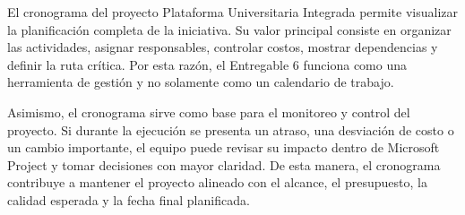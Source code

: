 \documentclass[11pt,spanish]{article}
\begin{document}
El cronograma del proyecto Plataforma Universitaria Integrada permite visualizar la planificación completa de la iniciativa. Su valor principal consiste en organizar las actividades, asignar responsables, controlar costos, mostrar dependencias y definir la ruta crítica. Por esta razón, el Entregable 6 funciona como una herramienta de gestión y no solamente como un calendario de trabajo.

Asimismo, el cronograma sirve como base para el monitoreo y control del proyecto. Si durante la ejecución se presenta un atraso, una desviación de costo o un cambio importante, el equipo puede revisar su impacto dentro de Microsoft Project y tomar decisiones con mayor claridad. De esta manera, el cronograma contribuye a mantener el proyecto alineado con el alcance, el presupuesto, la calidad esperada y la fecha final planificada.


\newpage
\appendix

\end{document}
